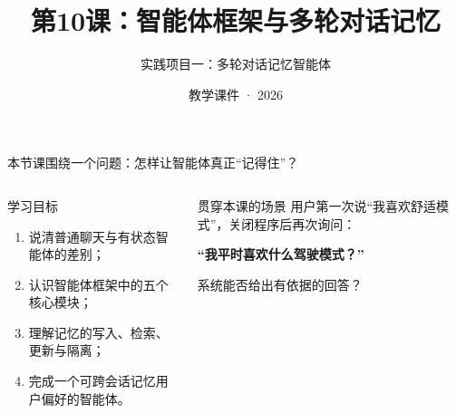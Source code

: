 

\title{第10课：智能体框架与多轮对话记忆}
\subtitle{实践项目一：多轮对话记忆智能体}
\author{}
\date{教学课件 · 2026}


\maketitle

\begin{frame}{本节课围绕一个问题：怎样让智能体真正“记得住”？}
  \begin{columns}[T,onlytextwidth]
      \begin{block}{学习目标}
        \begin{enumerate}
          \item 说清普通聊天与有状态智能体的差别；
          \item 认识智能体框架中的五个核心模块；
          \item 理解记忆的写入、检索、更新与隔离；
          \item 完成一个可跨会话记忆用户偏好的智能体。
        \end{enumerate}
      \end{block}
      \begin{alertblock}{贯穿本课的场景}
        用户第一次说“我喜欢舒适模式”，关闭程序后再次询问：
        \begin{center}
          \textbf{“我平时喜欢什么驾驶模式？”}
        \end{center}
        系统能否给出有依据的回答？
      \end{alertblock}
  \end{columns}
\end{frame}

